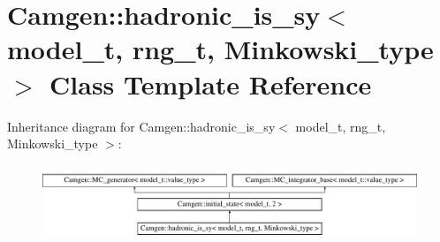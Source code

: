 \hypertarget{a00259}{}\section{Camgen\+:\+:hadronic\+\_\+is\+\_\+sy$<$ model\+\_\+t, rng\+\_\+t, Minkowski\+\_\+type $>$ Class Template Reference}
\label{a00259}
Inheritance diagram for Camgen\+:\+:hadronic\+\_\+is\+\_\+sy$<$ model\+\_\+t, rng\+\_\+t, Minkowski\+\_\+type $>$\+:\begin{figure}[H]
\begin{center}
\leavevmode
\includegraphics[height=2.326870cm]{a00259}
\end{center}
\end{figure}
